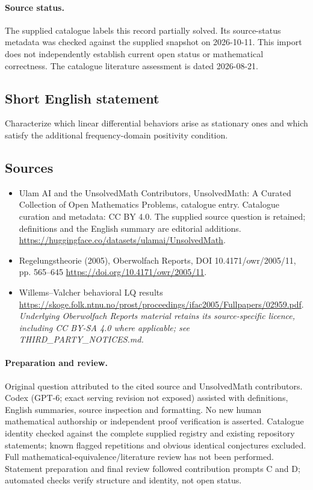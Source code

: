 \documentclass[11pt]{article}
\begin{document}
\paragraph{Source status.}
The supplied catalogue labels this record partially solved. Its source-status metadata was checked against the supplied snapshot on 2026-10-11. This import does not independently establish current open status or mathematical correctness. The catalogue literature assessment is dated 2026-08-21.
\subsection{Short English statement}
Characterize which linear differential behaviors arise as stationary ones and which satisfy the additional frequency-domain positivity condition.
\subsection{Sources}
\begin{itemize}
\item[\hypertarget{source:statement:1}{S1}] Ulam AI and the UnsolvedMath Contributors, UnsolvedMath: A Curated Collection of Open Mathematics Problems, catalogue entry. Catalogue curation and metadata: CC BY 4.0. The supplied source question is retained; definitions and the English summary are editorial additions.
\url{https://huggingface.co/datasets/ulamai/UnsolvedMath}.
\item[\hypertarget{source:statement:2}{S2}] Regelungstheorie (2005), Oberwolfach Reports, DOI 10.4171/owr/2005/11, pp. 565--645
\url{https://doi.org/10.4171/owr/2005/11}.
\item[\hypertarget{source:statement:3}{S3}] Willems--Valcher behavioral LQ results
\url{https://skoge.folk.ntnu.no/prost/proceedings/ifac2005/Fullpapers/02959.pdf}.
\textit{Underlying Oberwolfach Reports material retains its source-specific licence, including CC BY-SA 4.0 where applicable; see THIRD\_PARTY\_NOTICES.md.}
\end{itemize}
\paragraph{Preparation and review.}
Original question attributed to the cited source and UnsolvedMath contributors. Codex (GPT-6; exact serving revision not exposed) assisted with definitions, English summaries, source inspection and formatting. No new human mathematical authorship or independent proof verification is asserted. Catalogue identity checked against the complete supplied registry and existing repository statements; known flagged repetitions and obvious identical conjectures excluded. Full mathematical-equivalence/literature review has not been performed. Statement preparation and final review followed contribution prompts C and D; automated checks verify structure and identity, not open status.
\label{end:statement}
\end{document}
